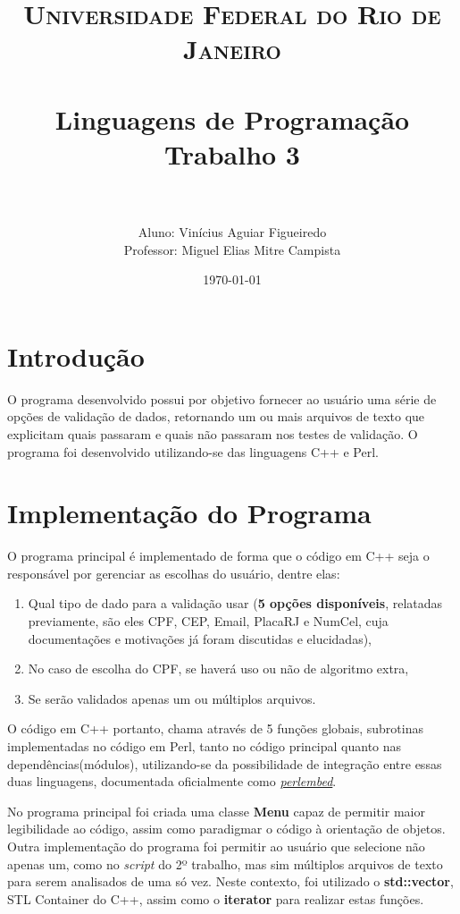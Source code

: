 \documentclass[paper=a4, fontsize=12pt]{scrartcl} %
\title{	
\normalfont \normalsize 
\textsc{Universidade Federal do Rio de Janeiro} \\ [25pt] %
\horrule{0.5pt} \\[0.4cm] %
\huge Linguagens de Programação \\
\huge Trabalho 3 \\ %
\horrule{2pt} \\[0.5cm] %
}
\author{Aluno: Vinícius Aguiar Figueiredo \\
		Professor: Miguel Elias Mitre Campista} %
\date{\normalsize\today} %
\numberwithin{equation}{section} %
\numberwithin{figure}{section} %
\numberwithin{table}{section} %
\begin{document}
\maketitle %
\clearpage

\section{Introdução}

O programa desenvolvido possui por objetivo fornecer ao usuário uma
série de opções de validação de dados, retornando um ou mais arquivos
de texto que explicitam quais passaram e quais não passaram nos testes de validação. O programa foi desenvolvido utilizando-se das linguagens C++ e Perl.

\section{Implementação do Programa}

O programa principal é implementado de forma que o código em C++ seja o responsável por gerenciar as escolhas do usuário, dentre elas:
\begin{enumerate}
\item Qual tipo de dado para a validação usar (\textbf{5 opções disponíveis}, relatadas previamente, são eles CPF, CEP, Email, PlacaRJ e NumCel, cuja documentações e motivações já foram discutidas e elucidadas),
\item No caso de escolha do CPF, se haverá uso ou não de algoritmo extra,
\item Se serão validados apenas um ou múltiplos arquivos.
\end{enumerate}

O código em C++ portanto, chama através de 5 funções globais, subrotinas implementadas no código em Perl, tanto no código principal quanto nas dependências(módulos), utilizando-se da possibilidade de integração entre essas duas linguagens, documentada oficialmente como \href{https://perldoc.perl.org/perlembed.html}{\textit{perlembed}}.

No programa principal foi criada uma classe \textbf{Menu} capaz de permitir maior legibilidade ao código, assim como paradigmar o código à orientação de objetos.
Outra implementação do programa foi permitir ao usuário que selecione não apenas um, como no \textit{script} do 2º trabalho, mas sim múltiplos arquivos de texto para serem analisados de uma só vez. Neste contexto, foi utilizado o \textbf{std::vector}, STL Container do C++, assim como o \textbf{iterator} para realizar estas funções.
\end{document}
